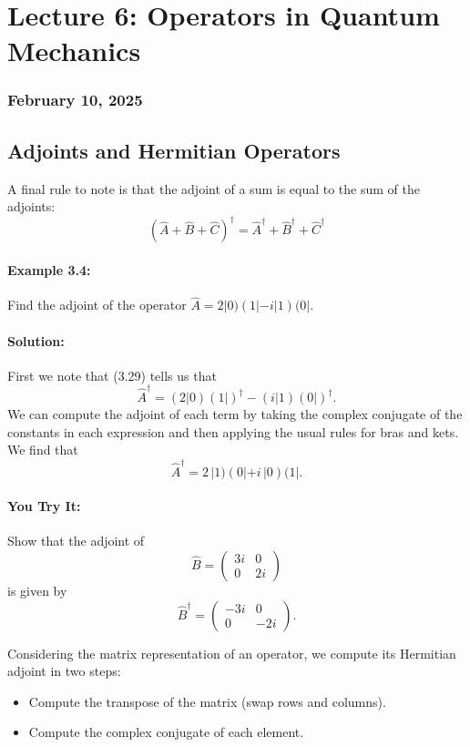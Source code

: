 \documentclass{article}
\begin{document}
\newpage
\section{Lecture 6: Operators in Quantum Mechanics}
\subsubsection*{February 10, 2025}

\subsection{Adjoints and Hermitian Operators}

A final rule to note is that the adjoint of a sum is equal to the sum of the adjoints:
\[
(\hat{A} + \hat{B} + \hat{C})^{\dagger} = \hat{A}^{\dagger} + \hat{B}^{\dagger} + \hat{C}^{\dagger}
\tag{3.29}
\]

\paragraph{Example 3.4:} Find the adjoint of the operator \(\hat{A} = 2|0)(1| - i|1)(0|\).

\paragraph{Solution:} 
First we note that (3.29) tells us that
\[
\hat{A}^{\dagger} = (2|0)(1|)^{\dagger} - (i|1)(0|)^{\dagger}.
\]
We can compute the adjoint of each term by taking the complex conjugate of the constants in each expression and then applying the usual rules for bras and kets. We find that
\[
\hat{A}^{\dagger} = 2 \,|1)(0| + i \,|0)(1|.
\]

\paragraph{You Try It:} 
Show that the adjoint of 
\[
\hat{B} = 
\begin{pmatrix}
3i & 0 \\
0 & 2i
\end{pmatrix}
\]
is given by 
\[
\hat{B}^{\dagger} =
\begin{pmatrix}
-3i & 0 \\
0 & -2i
\end{pmatrix}.
\]

Considering the matrix representation of an operator, we compute its Hermitian adjoint in two steps:
\begin{itemize}
\item Compute the transpose of the matrix (swap rows and columns).
\item Compute the complex conjugate of each element.
\end{itemize}
\end{document}

